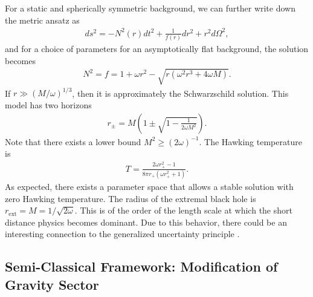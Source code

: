 \documentclass[12pt]{article}
\newcommand{\2}{$^2$}
\newcommand{\3}{$^3$}
\newcommand{\4}{$_4$}
\newcommand{\5}{$_5$}
\begin{document}
\begin{description}
For a static and spherically symmetric background, we can further write down the metric ansatz as
\begin{eqnarray}
ds^{2} = -N^{2}(r) dt^{2} + \frac{1}{f(r)} dr^{2} + r^{2} d\Omega^{2},
\end{eqnarray}
and for a choice of parameters for an asymptotically flat background, the solution becomes \cite{Kehagias:2009is, Park:2009zra}
\begin{eqnarray}
N^{2} = f = 1 + \omega r^{2} - \sqrt{r (\omega^{2} r^{3} + 4 \omega M)}.
\end{eqnarray}
If $r \gg (M/\omega)^{1/3}$, then it is approximately the Schwarzschild solution.
This model has two horizons
\begin{eqnarray}
r_{\pm} = M \left( 1 \pm \sqrt{1 - \frac{1}{2\omega M^{2}}} \right).
\end{eqnarray}
Note that there exists a lower bound $M^2 \geqslant (2\omega)^{-1}$.
The Hawking temperature is
\begin{eqnarray}
T = \frac{2 \omega r_{+}^{2} -1}{8\pi r_{+} (\omega r_{+}^{2} + 1)}.
\end{eqnarray}
As expected, there exists a parameter space that allows a stable solution with zero Hawking temperature.
The radius of the extremal black hole is $r_{\text{ext}}=M=1/\sqrt{2\omega}$. This is of the order of the length scale at which the short distance physics becomes dominant. Due to this behavior, there could be an interesting connection to the generalized uncertainty principle \cite{Myung:2009va}.

\end{description}

\subsection{Semi-Classical Framework: Modification of Gravity Sector}\label{grav}
\end{document}
